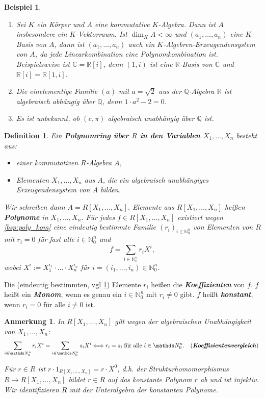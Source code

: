 \documentclass[a4paper, twoside, 11pt, ngerman]{report}
\newcommand{\CC}{\mathds C}
\newcommand{\NN}{\mathds N}
\newcommand{\QQ}{\mathds Q}
\newcommand{\RR}{\mathds R}
\newcommand{\gdw}{\Longleftrightarrow}
\theoremstyle{definistyle}
\newtheorem{defini}[satz]{Definition}
\newtheorem{anm}[satz]{Anmerkung}
\newtheorem{bsp}[satz]{Beispiel}
\theoremstyle{remark}
\newcommand{\defn}[1]{\textit{\bfseries #1}}
\begin{document}
\begin{bsp}\label{bsp:k_basis_polykomb}
\begin{enumerate}[label=(\alph*)]
    \item Sei $K$ ein Körper und $A$ eine kommutative $K$-Algebra. Dann ist $A$ insbesondere ein $K$-Vektorraum. Ist $\dim_K A < \infty$ und $(a_1, \ldots, a_n)$ eine $K$-Basis von $A$, dann ist $(a_1, \ldots, a_n)$ auch ein $K$-Algebren-Erzeugendensystem von $A$, da jede Linearkombination eine Polynomkombination ist. Beispielsweise ist
    $\CC = \RR[i]$, denn $(1, i)$ ist eine $\RR$-Basis von $\CC$ und $\RR[i] = \RR[1, i]$.
    \item Die einelementige Familie $(a)$ mit $a = \sqrt{2}$ aus der $\QQ$-Algebra $\RR$ ist algebraisch abhängig über $\QQ$, denn $1 \cdot a^2 - 2 = 0$.
    \item Es ist unbekannt, ob $(e,\pi)$ algebraisch unabhängig über $\QQ$ ist.
\end{enumerate}
\end{bsp}

\begin{defini}\label{def:polynomring}
Ein \defn{Polynomring über $R$ in den Variablen $X_1, \ldots, X_n$} besteht aus:
\begin{itemize}
    \item einer kommutativen $R$-Algebra $A$,
    \item Elementen $X_1, \ldots, X_n$ aus $A$, die ein algebraisch unabhängiges Erzeugendensystem von $A$ bilden.
\end{itemize}

Wir schreiben dann $A = R[X_1, \ldots, X_n]$. Elemente aus $R[X_1, \ldots, X_n]$ heißen \defn{Polynome} in $X_1, \ldots, X_n$.
Für jedes $f \in R[X_1, \ldots, X_n]$ existiert wegen \ref{bsp:poly_kom} eine eindeutig
bestimmte Familie $(r_i)_{i \in \NN_0^n}$ von Elementen von $R$ mit $r_i = 0$ für fast alle $i \in \NN_0^n$ und
\[
f = \sum_{i \in \NN_0^n} r_i X^i,
\]
wobei $X^i := X_1^{i_1} \cdot\ldots\cdot X_n^{i_n}$ für $i = (i_1, \ldots, i_n) \in \NN_0^n$.
\end{defini}
Die (eindeutig bestimmten, vgl \ref{anm:koeffizientenvergleich}) Elemente $r_i$ heißen die \defn{Koeffizienten} von $f$.  
$f$ heißt ein \defn{Monom}, wenn es genau ein $i \in \NN_0^n$ mit $r_i \neq 0$ gibt.  
$f$ heißt \defn{konstant}, wenn $r_i = 0$ für alle $i \neq 0$ ist.

\begin{anm}\label{anm:koeffizientenvergleich}
In $R[X_1, \ldots, X_n]$ gilt wegen der algebraischen Unabhängigkeit von $X_1, \ldots, X_n$:  
\[
\sum_{i \in \NN_0^n} r_i X^i = \sum_{i \in \NN_0^n} s_i X^i \gdw r_i = s_i \; \text{für alle } i \in \NN_0^n.
\quad \text{(\defn{Koeffizientenvergleich}) }
\]

Für $r \in R$ ist $r \cdot 1_{R[X_1,\ldots,X_n]} = r \cdot X^0$, d.h. der Strukturhomomorphismus $R \to R[X_1, \ldots, X_n]$ bildet $r \in R$ auf das konstante Polynom $r$ ab und ist injektiv. Wir identifizieren $R$ mit der Unteralgebra der konstanten Polynome.
\end{anm}
\end{document}
